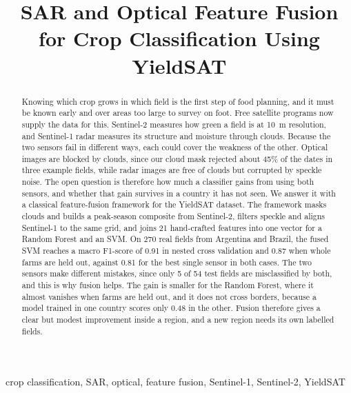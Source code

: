 \documentclass[conference]{IEEEtran}
\begin{document}
\title{SAR and Optical Feature Fusion for Crop Classification Using YieldSAT}

\author{
}

\maketitle

\begin{abstract}
Knowing which crop grows in which field is the first step of food planning, and it must be known early and over areas too large to survey on foot. Free satellite programs now supply the data for this. Sentinel-2 measures how green a field is at 10~m resolution, and Sentinel-1 radar measures its structure and moisture through clouds. Because the two sensors fail in different ways, each could cover the weakness of the other. Optical images are blocked by clouds, since our cloud mask rejected about 45\% of the dates in three example fields, while radar images are free of clouds but corrupted by speckle noise. The open question is therefore how much a classifier gains from using both sensors, and whether that gain survives in a country it has not seen. We answer it with a classical feature-fusion framework for the YieldSAT dataset. The framework masks clouds and builds a peak-season composite from Sentinel-2, filters speckle and aligns Sentinel-1 to the same grid, and joins 21 hand-crafted features into one vector for a Random Forest and an SVM. On 270 real fields from Argentina and Brazil, the fused SVM reaches a macro F1-score of 0.91 in nested cross validation and 0.87 when whole farms are held out, against 0.81 for the best single sensor in both cases. The two sensors make different mistakes, since only 5 of 54 test fields are misclassified by both, and this is why fusion helps. The gain is smaller for the Random Forest, where it almost vanishes when farms are held out, and it does not cross borders, because a model trained in one country scores only 0.48 in the other. Fusion therefore gives a clear but modest improvement inside a region, and a new region needs its own labelled fields.
\end{abstract}

\begin{IEEEkeywords}
crop classification, SAR, optical, feature fusion, Sentinel-1, Sentinel-2, YieldSAT
\end{IEEEkeywords}
\end{document}
